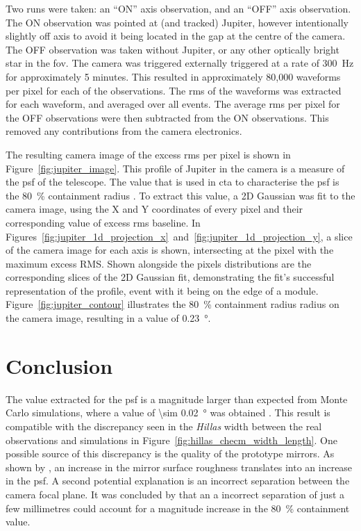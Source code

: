 Two runs were taken: an ``ON'' axis observation, and an ``OFF'' axis observation. The ON observation was pointed at (and tracked) Jupiter, however intentionally slightly off axis to avoid it being located in the gap at the centre of the camera. The OFF observation was taken without Jupiter, or any other optically bright star in the \gls{fov}. The camera was triggered externally triggered at a rate of \SI{300}{Hz} for approximately 5 minutes. This resulted in approximately 80,000 waveforms per pixel for each of the observations. The \gls{rms} of the waveforms was extracted for each waveform, and averaged over all events. The average \gls{rms} per pixel for the OFF observations were then subtracted from the ON observations. This removed any contributions from the camera electronics. 

The resulting camera image of the excess \gls{rms} per pixel is shown in Figure~\ref{fig:jupiter_image}. This profile of Jupiter in the camera is a measure of the \gls{psf} of the telescope. The value that is used in \gls{cta} to characterise the \gls{psf} is the \SI{80}{\percent} containment radius \cite{Armstrong2015,Rulten2016}. To extract this value, a 2D Gaussian was fit to the camera image, using the X and Y coordinates of every pixel and their corresponding value of excess \gls{rms} baseline. In Figures~\ref{fig:jupiter_1d_projection_x}~and~\ref{fig:jupiter_1d_projection_y}, a slice of the camera image for each axis is shown, intersecting at the pixel with the maximum excess RMS. Shown alongside the pixels distributions are the corresponding slices of the 2D Gaussian fit, demonstrating the fit's successful representation of the profile, event with it being on the edge of a module. Figure~\ref{fig:jupiter_contour} illustrates the \SI{80}{\percent} containment radius radius on the camera image, resulting in a value of \SI{0.23}{\degree}. 

\section{Conclusion} \label{section:onsky_conclusion}

The value extracted for the \gls{psf} is a magnitude larger than expected from Monte Carlo simulations, where a value of \SI{\sim 0.02}{\degree} was obtained \cite{Armstrong2015}. This result is compatible with the discrepancy seen in the \textit{Hillas} width between the real observations and simulations in Figure~\ref{fig:hillas_checm_width_length}. One possible source of this discrepancy is the quality of the prototype mirrors. As shown by \textcite{Rulten2016}, an increase in the mirror surface roughness translates into an increase in the \gls{psf}. A second potential explanation is an incorrect separation between the camera focal plane. It was concluded by \textcite{Rulten2016} that an a incorrect separation of just a few millimetres could account for a magnitude increase in the \SI{80}{\percent} containment value. 

